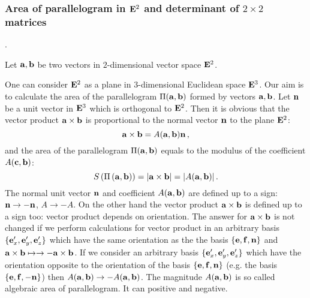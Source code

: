 \documentclass[12pt]{article}
\numberwithin{equation}{section}
\begin{document}
\subsubsection {Area of parallelogram in ${\bf E}^2$ 
and determinant of $2\times 2$ matrices}.

  Let ${\bf a},{\bf b}$ be two vectors in $2$-dimensional vector space ${\bf E}^2$.

  One can consider ${\bf E}^2$ as a plane in $3$-dimensional 
Euclidean space ${\bf E}^3$.
Our aim is to calculate the area of the parallelogram $\Pi({\bf a},{\bf b})$
 formed by vectors ${\bf a},{\bf b}$.
   Let ${\bf n}$ be a unit vector in ${\bf E}^3$ which 
is orthogonal to ${\bf E}^2$.
   Then it is obvious that 
the vector product ${\bf a}\times {\bf b}$ is proportional to 
the normal vector ${\bf n}$ to the plane ${\bf E}^2$:
             \begin{equation}\label{defofvectorproduct3}
                 {\bf a}\times {\bf b}=A({\bf a},{\bf b}){\bf n}\,,
                      \end{equation}
  and the area of the parallelogram $\Pi({\bf a},{\bf b})$ 
equals to the modulus 
of the coefficient $A({\bf c},{\bf b})$:
           \begin{equation}\label{defofvectorproductmodularea}
                 S\left(\Pi\left({\bf a},{\bf b}\right)\right)=
           |{\bf a}\times {\bf b}|=|A({\bf a},{\bf b})|\,.
                      \end{equation}
{\footnotesize The normal unit vector ${\bf n}$ and coefficient $A({\bf a},{\bf b})$ are defined up to a sign: ${\bf n}\to-{\bf n}$, $A\to-A$.
On the other hand the vector product ${\bf a}\times {\bf b}$ is defined up to a sign too: vector
product depends on orientation.
The answer for
${\bf a}\times {\bf b}$ is not changed if we perform calculations for vector product in
an arbitrary basis $\{{\bf e}'_x,{\bf e}'_y,{\bf e}'_z\}$ which have the same orientation as the
the basis $\{{\bf e},{\bf f},{\bf n}\}$ and  ${\bf a}\times {\bf b}\mapsto \to -{\bf a}\times {\bf b}$.
If we consider an arbitrary basis $\{{\bf e}'_x,{\bf e}'_y,{\bf e}'_z\}$ which have the orientation opposite to the orientation
of the basis $\{{\bf e},{\bf f},{\bf n}\}$ (e.g. the basis $\{{\bf e},{\bf f},-{\bf n}\}$) then $A({\bf a},{\bf b})\to -A({\bf a},{\bf b})$.
 The magnitude $A({\bf a},{\bf b})$ is so called algebraic area of parallelogram. It can positive and negative.
}
\end{document}
